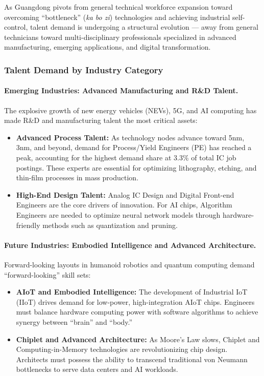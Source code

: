 \documentclass[12pt,a4paper]{article}
\begin{document}
As Guangdong pivots from general technical workforce expansion toward overcoming
``bottleneck'' (\textit{ka bo zi}) technologies and achieving industrial
self-control, talent demand is undergoing a structural evolution — away from
general technicians toward multi-disciplinary professionals specialized in
advanced manufacturing, emerging applications, and digital transformation.

\subsubsection{Talent Demand by Industry Category}

\paragraph{Emerging Industries: Advanced Manufacturing and R\&D Talent.}
The explosive growth of new energy vehicles (NEVs), 5G, and AI computing has
made R\&D and manufacturing talent the most critical assets:

\begin{itemize}
    \item \textbf{Advanced Process Talent:} As technology nodes advance toward
          5nm, 3nm, and beyond, demand for Process/Yield Engineers (PE) has
          reached a peak, accounting for the highest demand share at 3.3\%
          of total IC job postings. These experts are essential for optimizing
          lithography, etching, and thin-film processes in mass production.
    \item \textbf{High-End Design Talent:} Analog IC Design and Digital
          Front-end Engineers are the core drivers of innovation. For AI chips,
          Algorithm Engineers are needed to optimize neural network models
          through hardware-friendly methods such as quantization and pruning.
\end{itemize}

\paragraph{Future Industries: Embodied Intelligence and Advanced Architecture.}
Forward-looking layouts in humanoid robotics and quantum computing demand
``forward-looking'' skill sets:

\begin{itemize}
    \item \textbf{AIoT and Embodied Intelligence:} The development of
          Industrial IoT (IIoT) drives demand for low-power, high-integration
          AIoT chips. Engineers must balance hardware computing power with
          software algorithms to achieve synergy between ``brain'' and ``body.''
    \item \textbf{Chiplet and Advanced Architecture:} As Moore's Law slows,
          Chiplet and Computing-in-Memory technologies are revolutionizing chip
          design. Architects must possess the ability to transcend traditional
          von Neumann bottlenecks to serve data centers and AI workloads.
\end{itemize}
\end{document}
